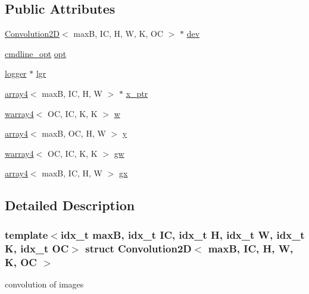 \subsection*{Public Attributes}
\begin{DoxyCompactItemize}
\item 
\hyperlink{structConvolution2D}{Convolution2D}$<$ maxB, IC, H, W, K, OC $>$ $\ast$ \hyperlink{structConvolution2D_a3b9891c27e266092619413a16518a9e9}{dev}
\item 
\hyperlink{structcmdline__opt}{cmdline\+\_\+opt} \hyperlink{structConvolution2D_ad873766a934a3589b2feec7933dc11f2}{opt}
\item 
\hyperlink{structlogger}{logger} $\ast$ \hyperlink{structConvolution2D_a1c0363cbb527e0dcdb032a2b6b5ea9e6}{lgr}
\item 
\hyperlink{structarray4}{array4}$<$ maxB, IC, H, W $>$ $\ast$ \hyperlink{structConvolution2D_a404b6e9b9a932e463f237d5bd35b2154}{x\+\_\+ptr}
\item 
\hyperlink{structwarray4}{warray4}$<$ OC, IC, K, K $>$ \hyperlink{structConvolution2D_a20027e8ac911e6ec9db15a7ecaf4a16a}{w}
\item 
\hyperlink{structarray4}{array4}$<$ maxB, OC, H, W $>$ \hyperlink{structConvolution2D_ae321933a802088a32112cdbd16b16c0f}{y}
\item 
\hyperlink{structwarray4}{warray4}$<$ OC, IC, K, K $>$ \hyperlink{structConvolution2D_acbd8375eef9aa08bd061b3898dbdc403}{gw}
\item 
\hyperlink{structarray4}{array4}$<$ maxB, IC, H, W $>$ \hyperlink{structConvolution2D_a1bc2147fc750b2587a82d865eef24d2c}{gx}
\end{DoxyCompactItemize}


\subsection{Detailed Description}
\subsubsection*{template$<$idx\+\_\+t maxB, idx\+\_\+t IC, idx\+\_\+t H, idx\+\_\+t W, idx\+\_\+t K, idx\+\_\+t OC$>$\newline
struct Convolution2\+D$<$ max\+B, I\+C, H, W, K, O\+C $>$}

convolution of images 



